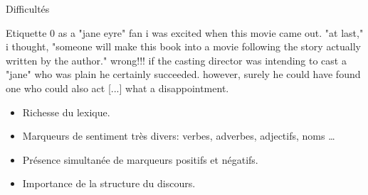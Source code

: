 \documentclass{beamer}
\begin{document}
\begin{frame}{Difficult\'es}
   \begin{alertblock}{Etiquette 0}
     as a "jane eyre" {\color{darkgreen} fan} i was {\color{darkgreen} excited} when this movie came out. "at last," i thought, "someone will make this book into a movie following the story actually written by the author." wrong!!! if the casting director was intending to cast a "jane" who was {\color{red} plain} he certainly {\color{darkgreen} succeeded}. {\color{red}however}, surely he could have found one who could also act [...] what a {\color{red} disappointment}.
   \end{alertblock}

   \begin{itemize}
   \item Richesse du lexique.
   \item Marqueurs de sentiment tr\`es divers: verbes, adverbes, adjectifs, noms \dots
   \item Pr\'esence simultan\'ee de marqueurs positifs et n\'egatifs.
   \item Importance de la structure du discours.
   \end{itemize}
\end{frame}
\end{document}
